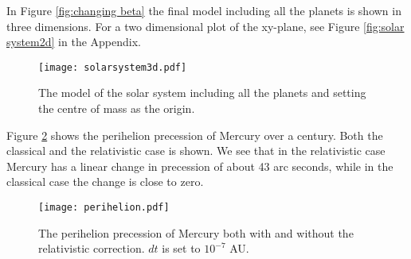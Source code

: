 In Figure \ref{fig:changing beta} the final model including all the planets is shown in three dimensions. For a two dimensional plot of the xy-plane, see Figure \ref{fig:solar system2d} in the Appendix.
\begin{figure}[htbp]
	\centering
	\texttt{[image: solarsystem3d.pdf]}
	\caption{The model of the solar system including all the planets and setting the centre of mass as the origin.}
	\label{fig:solar system}
\end{figure}

Figure \ref{fig:perihelion} shows the perihelion precession of Mercury over a century. Both the classical and the relativistic case is shown. We see that in the relativistic case Mercury has a linear change in precession of about 43 arc seconds, while in the classical case the change is close to zero.
\begin{figure}[htbp]
	\centering
	\texttt{[image: perihelion.pdf]}
	\caption{The perihelion precession of Mercury both with and without the relativistic correction. $dt$ is set to $10^{-7}$ AU.}
	\label{fig:perihelion}
\end{figure}
